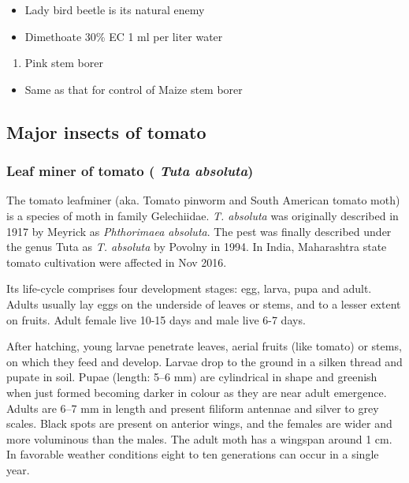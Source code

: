 \documentclass[
  openany]{book}
\providecommand{\tightlist}{%
  \setlength{\itemsep}{0pt}\setlength{\parskip}{0pt}}
\begin{document}
\begin{itemize}
\tightlist
\item
  Lady bird beetle is its natural enemy
\item
  Dimethoate 30\% EC 1 ml per liter water
\end{itemize}

\begin{enumerate}
\def\labelenumi{\arabic{enumi}.}
\setcounter{enumi}{2}
\tightlist
\item
  Pink stem borer
\end{enumerate}

\begin{itemize}
\tightlist
\item
  Same as that for control of Maize stem borer
\end{itemize}

\hypertarget{major-insects-of-tomato}{%
\subsection{Major insects of tomato}\label{major-insects-of-tomato}}

\hypertarget{leaf-miner-of-tomato-tuta-absoluta}{%
\subsubsection{\texorpdfstring{Leaf miner of tomato ( \emph{Tuta absoluta})}{Leaf miner of tomato ( Tuta absoluta)}}\label{leaf-miner-of-tomato-tuta-absoluta}}

The tomato leafminer (aka. Tomato pinworm and South American tomato moth) is a species of moth in family Gelechiidae. \emph{T. absoluta} was originally described in 1917 by Meyrick as \emph{Phthorimaea absoluta}. The pest was finally described under the genus Tuta as \emph{T. absoluta} by Povolny in 1994. In India, Maharashtra state tomato cultivation were affected in Nov 2016.

Its life-cycle comprises four development stages: egg, larva, pupa and adult. Adults usually lay eggs on the underside of leaves or stems, and to a lesser extent on fruits. Adult female live 10-15 days and male live 6-7 days.

After hatching, young larvae penetrate leaves, aerial fruits (like tomato) or stems, on which they feed and develop. Larvae drop to the ground in a silken thread and pupate in soil. Pupae (length: 5--6 mm) are cylindrical in shape and greenish when just formed becoming darker in colour as they are near adult emergence. Adults are 6--7 mm in length and present filiform antennae and silver to grey scales. Black spots are present on anterior wings, and the females are wider and more voluminous than the males. The adult moth has a wingspan around 1 cm. In favorable weather conditions eight to ten generations can occur in a single year.
\end{document}
